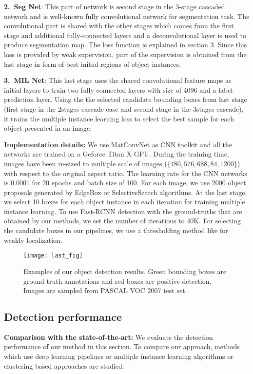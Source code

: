 \documentclass[10pt,twocolumn,letterpaper]{article}
\begin{document}
\textbf{2.~Seg Net}: This part of network is second stage in the 3-stage cascaded network and is well-known fully convolutional network for segmentation task. The convolutional part is shared with the other stages which comes from the first stage and additional fully-connected layers and a deconvolutional layer is used to produce segmentation map. The loss function is explained in section 3. Since this loss is provided by weak supervision, part of the supervision is obtained from the last stage in form of best initial regions of object instances.

\textbf{3.~MIL Net}: This last stage uses the shared convolutional feature maps as initial layers to train two fully-connected layers with size of 4096 and a label prediction layer. Using the the selected candidate bounding boxes from last stage (first stage in the 2stages cascade case and second stage in the 3stages cascade), it trains the multiple instance learning loss to select the best sample for each object presented in an image.


\textbf{Implementation details:} We use MatConvNet \cite{matconv} as CNN toolkit and all the networks are trained on a Geforce Titan X GPU. During the training time, images have been re-sized to multiple scale of images ($\{480, 576, 688, 84, 1200\}$) with respect to the original aspect ratio. The learning rate for the CNN networks is 0.0001 for 20 epochs and batch size of 100. For each image, we use 2000 object proposals generated by EdgeBox or SelectiveSearch algorithms. At the last stage, we select 10 boxes for each object instance in each iteration for training multiple instance learning. To use Fast-RCNN detection with the ground-truths that are obtained by our methods, we set the number of iterations to 40K. For selecting the candidate boxes in our pipelines, we use a thresholding method like \cite{gap_paper} for weakly localization.

\begin{figure*}[htbp]
 \centering
 \texttt{[image: last\_fig]}
 \caption{Examples of our object detection results. Green bounding boxes are ground-truth annotations and red boxes are positive detection. Images are sampled from PASCAL VOC 2007 test set.}
  \label{fig:2}
 \end{figure*}

\subsection{Detection performance}
\textbf{Comparison with the state-of-the-art:} We evaluate the detection performance of our method in this section. To compare our approach, methods which use deep learning pipelines \cite{bilen16, li16} or multiple instance learning algorithms \cite{cinbis} or clustering based approaches \cite{bilen15} are studied.
\end{document}
